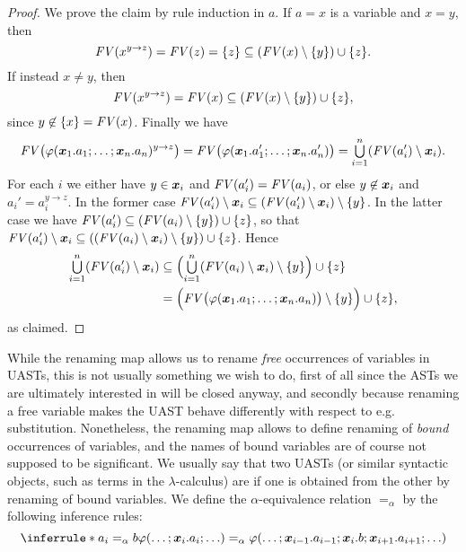 \documentclass[a4paper, 11pt, article, danish, oneside]{memoir}
\DeclarePairedDelimiter{\auxdelimparen}{(}{)}
\newcommand*\union\cup
\DeclareMathOperator*{\smallbigcup}{\textstyle\bigcup}
\DeclareMathOperator*{\bigunion}{\mathchoice
    {\smallbigcup}%
    {\bigcup}%
    {\bigcup}%
    {\bigcup}%
}
\renewcommand{\phi}{\varphi}
\newcommand{\freevar}[2][]{\mathit{FV}\auxdelimparen[#1]{#2}}
\begin{document}
\begin{proof}
    We prove the claim by rule induction in $a$. If $a = x$ is a variable and $x = y$, then
    \begin{equation*}
        \freevar{x^{y \to z}}
            = \freevar{z}
            = \{z\}
            \subseteq (\freevar{x} \setminus \{y\}) \union \{z\}.
    \end{equation*}
    If instead $x \neq y$, then
    \begin{equation*}
        \freevar{x^{y \to z}}
            = \freevar{x}
            \subseteq (\freevar{x} \setminus \{y\}) \union \{z\},
    \end{equation*}
    since $y \not\in \{x\} = \freevar{x}$. Finally we have
    \begin{equation*}
        \freevar[\big]{\phi(\seq{x}_1.a_1 ; \ldots ; \seq{x}_n.a_n)^{y \to z}}
            = \freevar[\big]{\phi(\seq{x}_1.a_1' ; \ldots ; \seq{x}_n.a_n')}
            = \bigunion_{i=1}^n (\freevar{a_i'} \setminus \seq{x}_i).
    \end{equation*}
    For each $i$ we either have $y \in \bm{x}_i$ and $\freevar{a_i'} = \freevar{a_i}$, or else $y \not\in \bm{x}_i$ and $a_i' = a_i^{y \to z}$. In the former case $\freevar{a_i'} \setminus \seq{x}_i \subseteq (\freevar{a_i'} \setminus \seq{x}_i) \setminus \{y\}$. In the latter case we have $\freevar{a_i'} \subseteq (\freevar{a_i} \setminus \{y\}) \union \{z\}$, so that $\freevar{a_i'} \setminus \seq{x}_i \subseteq ((\freevar{a_i} \setminus \seq{x}_i) \setminus \{y\}) \union \{z\}$. Hence
    \begin{align*}
        \bigunion_{i=1}^n (\freevar{a_i'} \setminus \seq{x}_i)
            &\subseteq \Bigl(\bigunion_{i=1}^n (\freevar{a_i} \setminus \seq{x}_i) \setminus \{y\} \Bigr) \union \{z\} \\
            &= \Bigl( \freevar[\big]{\phi(\seq{x}_1.a_1 ; \ldots ; \seq{x}_n.a_n)} \setminus \{y\} \Bigr) \union \{z\},
    \end{align*}
    as claimed.
\end{proof}


While the renaming map allows us to rename \emph{free} occurrences of variables in UASTs, this is not usually something we wish to do, first of all since the ASTs we are ultimately interested in will be closed anyway, and secondly because renaming a free variable makes the UAST behave differently with respect to e.g. substitution. Nonetheless, the renaming map allows to define renaming of \emph{bound} occurrences of variables, and the names of bound variables are of course not supposed to be significant. We usually say that two UASTs (or similar syntactic objects, such as terms in the $\lambda$-calculus) are  if one is obtained from the other by renaming of bound variables. We define the $\alpha$-equivalence relation $=_\alpha$ by the following inference rules:
%
\begin{equation*}
    \inferrule*{
        a_i =_\alpha b
    }{
        \phi(\ldots ; \seq{x}_i.a_i ; \ldots)
            =_\alpha \phi( \ldots ; \seq{x}_{i-1}.a_{i-1} ; \seq{x}_i.b ; \seq{x}_{i+1}.a_{i+1} ; \ldots )
    }
\end{equation*}
\end{document}
